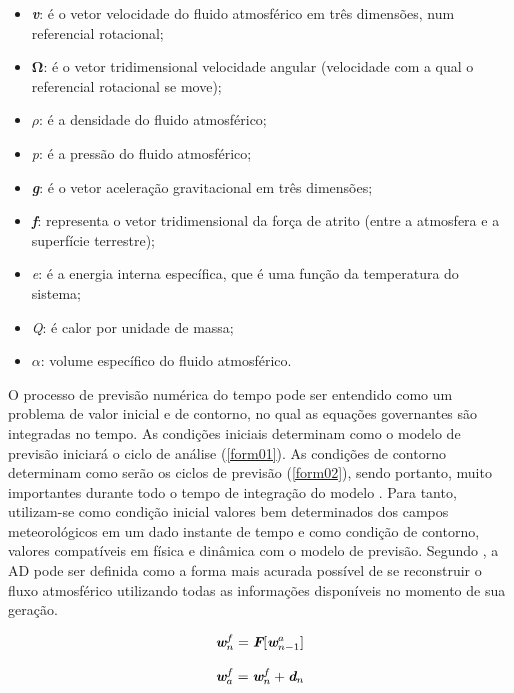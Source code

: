 \begin{itemize}
\item \textbf{\textit{v}}: é o vetor velocidade do fluido atmosférico em três dimensões, num referencial rotacional;
\item $\mathbf{\Omega}$: é o vetor tridimensional velocidade angular (velocidade com a qual o referencial rotacional se move);
\item $\rho$: é a densidade do fluido atmosférico;
\item \textit{p}: é a pressão do fluido atmosférico;
\item \textbf{\textit{g}}: é o vetor aceleração gravitacional em três dimensões;
\item \textbf{\textit{f}}: representa o vetor tridimensional da força de atrito (entre a atmosfera e a superfície terrestre);
\item \textit{e}: é a energia interna específica, que é uma função da temperatura do sistema;
\item \textit{Q}: é calor por unidade de massa;
\item $\alpha$: volume específico do fluido atmosférico. 
\end{itemize}

O processo de previsão numérica do tempo pode ser entendido como um problema de valor inicial e de contorno, no qual as equações governantes são integradas no tempo. As condições iniciais determinam como o modelo de previsão iniciará o ciclo de análise (\autoref{form01}). As condições de contorno determinam como serão os ciclos de previsão (\autoref{form02}), sendo portanto, muito importantes durante todo o tempo de integração do modelo \cite{nowosad01}. Para tanto, utilizam-se como condição inicial valores bem determinados dos campos meteorológicos em um dado instante de tempo e como condição de contorno, valores compatíveis em física e dinâmica com o modelo de previsão. Segundo , a AD pode ser definida como a forma mais acurada possível de se reconstruir o fluxo atmosférico utilizando todas as informações disponíveis no momento de sua geração. 

\begin{equation}
\textit{\textbf{w}}^{f}_{n}=\textit{\textbf{F}}[\textit{\textbf{w}}^{a}_{n-1}]
\label{form04}
\end{equation}

\begin{equation}
\textit{\textbf{w}}^{f}_{a}=\textit{\textbf{w}}^{f}_{n}+\textit{\textbf{d}}_{n}
\label{form05}
\end{equation}

